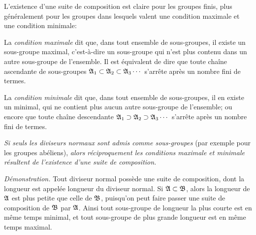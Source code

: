 L'existence d'une suite de composition est claire pour les groupes finis, plus généralement pour les groupes dans lesquels valent une condition maximale et une condition minimale:

La \emph{condition maximale} dit que, dans tout ensemble de sous-groupes, il existe un sous-groupe maximal, c'est-à-dire un sous-groupe qui n'est plus contenu dans un autre sous-groupe de l'ensemble. Il est équivalent de dire que toute chaîne ascendante de sous-groupes $\mathfrak{A}_1\subset\mathfrak{A}_2\subset\mathfrak{A}_3\cdots$ s'arrête après un nombre fini de termes.

La \emph{condition minimale} dit que, dans tout ensemble de sous-groupes, il en existe un minimal, qui ne contient plus aucun autre sous-groupe de l'ensemble; ou encore que toute chaîne descendante $\mathfrak{A}_1\supset\mathfrak{A}_2\supset\mathfrak{A}_3\cdots$ s'arrête après un nombre fini de termes.

\emph{Si seuls les diviseurs normaux sont admis comme sous-groupes} (par exemple pour les groupes abéliens), \emph{alors réciproquement les conditions maximale et minimale résultent de l'existence d'une suite de composition.}

\emph{Démonstration.} Tout diviseur normal possède une suite de composition, dont la longueur est appelée longueur du diviseur normal. Si $\mathfrak{A}\subset\mathfrak{B}$, alors la longueur de $\mathfrak{A}$ est plus petite que celle de $\mathfrak{B}$, puisqu'on peut faire passer une suite de composition de $\mathfrak{B}$ par $\mathfrak{A}$. Ainsi tout sous-groupe de longueur la plus courte est en même temps minimal, et tout sous-groupe de plus grande longueur est en même temps maximal.
